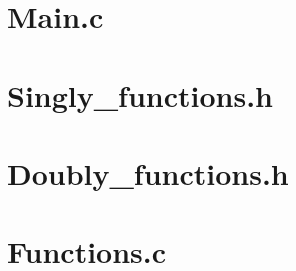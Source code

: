 \section{Main.c}

\section{Singly\_functions.h}

\section{Doubly\_functions.h}

\section{Functions.c}
